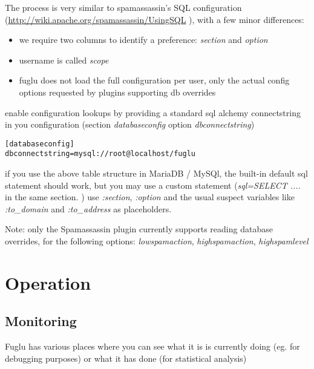 \documentclass[letterpaper,10pt,english]{sphinxmanual}
\begin{document}
The process is very similar to spamassassin's SQL configuration  (\href{http://wiki.apache.org/spamassassin/UsingSQL}{http://wiki.apache.org/spamassassin/UsingSQL} ), with a few minor differences:
\begin{itemize}
\item {} 
we require two columns to identify a preference: \emph{section} and \emph{option}

\item {} 
username is called \emph{scope}

\item {} 
fuglu does not load the full configuration per user, only the actual config options requested by plugins supporting db overrides

\end{itemize}

enable configuration lookups by providing a standard sql alchemy connectstring in you configuration (section \emph{databaseconfig} option \emph{dbconnectstring})

\begin{Verbatim}[commandchars=\\\{\}]
[databaseconfig]
dbconnectstring=mysql://root@localhost/fuglu
\end{Verbatim}

if you use the above table structure in MariaDB / MySQl, the built-in default sql statement should work, but you may use a custom statement (\emph{sql=SELECT ....} in the same section.  ) use \emph{:section}, \emph{:option} and the usual suspect variables like \emph{:to\_domain} and \emph{:to\_address} as placeholders.

Note: only the Spamassassin plugin currently supports reading database overrides, for the following options: \emph{lowspamaction}, \emph{highspamaction}, \emph{highspamlevel}


\chapter{Operation}
\label{operation-index:operation}\label{operation-index::doc}

\section{Monitoring}
\label{operation-index:monitoring}
Fuglu has various places where you can see what it is is currently doing (eg. for debugging purposes) or what it has done (for statistical analysis)
\end{document}
